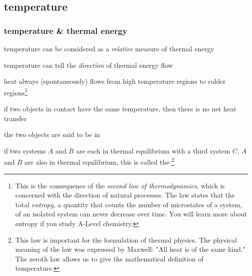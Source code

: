 


\subsection{temperature}

\subsubsection{temperature \& thermal energy}

\cmt temperature can be considered as a \emph{relative} measure of thermal energy

temperature can tell the \emph{direction} of thermal energy flow

heat always (spontaneously) flows from high temperature regions to colder regions\footnote{This is the consequence of the \emph{second law of thermodynamics}, which is concerned with the direction of natural processes. The law states that the total \emph{entropy}, a quantity that counts the number of microstates of a system, of an isolated system can never decrease over time. You will learn more about entropy if you study A-Level chemistry.}

\cmt if two objects in contact have the same temperature, then there is no net heat transfer

the two objects are said to be in 

\cmt if two systems $A$ and $B$ are each in thermal equilibrium with a third system $C$, $A$ and $B$ are also in thermal equilibrium, this is called the 
\footnote{This law is important for the formulation of thermal physics. The physical meaning of the law was expressed by Maxwell: "All heat is of the same kind." The zeroth law allows us to give the mathematical definition of temperature.}


